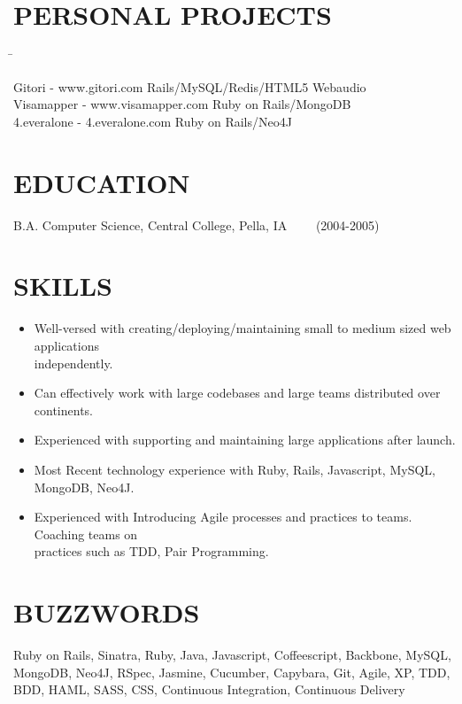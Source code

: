 \documentclass{res}
\begin{document}
\begin{resume}
\section{PERSONAL PROJECTS}  \vspace{-0.01in}   
   \begin{tabbing}
   \hspace{3.3in}\= \kill %

    Gitori - www.gitori.com   \>Rails/MySQL/Redis/HTML5 Webaudio \\

    Visamapper - www.visamapper.com   \>Ruby on Rails/MongoDB \\
 
    4.everalone - 4.everalone.com \>Ruby on Rails/Neo4J \\
\end{tabbing}
\vspace{0.1in}         
\section{EDUCATION}\vspace{0.15in}
    B.A. Computer Science, Central College, Pella, IA
\ \ \ \   (2004-2005)

\vspace{0.1in}         
\section{SKILLS} \vspace{0.25in}         
 \begin{itemize} \itemsep 0pt  
 \setlength{\itemindent}{-1.8em}
\item Well-versed with creating/deploying/maintaining small to medium sized web applications\\ independently.
\item Can effectively work with large codebases and large teams distributed over continents.
\item Experienced with supporting and maintaining large applications after launch.
\item Most Recent technology experience with Ruby, Rails, Javascript, MySQL, MongoDB, Neo4J. 
\item Experienced with Introducing Agile processes and practices to teams. Coaching teams on \\practices such as TDD, Pair Programming.

 \end{itemize}

\vspace{0.1in}         
\section{BUZZWORDS}\vspace{0.15in}
Ruby on Rails, Sinatra, Ruby, Java, Javascript, Coffeescript, Backbone, MySQL, MongoDB, Neo4J, RSpec, Jasmine, Cucumber, Capybara, Git, Agile, XP, TDD, BDD, HAML, SASS, CSS, Continuous Integration, Continuous Delivery 
 
\end{resume}
\end{document}
